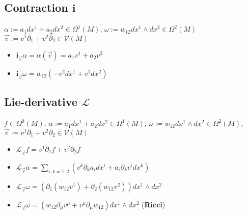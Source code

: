 \documentclass{scrartcl}
\renewcommand{\i}{\mathbf{i}}
\renewcommand{\L}{\mathbf{\mathcal{L}}}
\begin{document}
    \subsection{Contraction \( \i \)}
      \( \alpha:= a_{1}dx^{1} + a_{2}dx^{2} \in \Omega^{1}(M) \),
      \( \omega:= w_{12}dx^{1}\wedge dx^{2} \in \Omega^{2}(M)\)
      \( \vec{v} := v^{1}\partial_{1} + v^{2}\partial_{2}\in\mathcal{V}(M) \)
      \begin{itemize}
        \item \( \i_{\vec{v}}\alpha = \alpha\left( \vec{v} \right) = a_{1}v^{1} + a_{2}v^{2} \)
        \item \( \i_{\vec{v}}\omega = w_{12}\left( -v^{2}dx^{1} + v^{1}dx^{2} \right) \)
      \end{itemize}

    \subsection{Lie-derivative \( \L \)}
       \( f\in \Omega^{0}(M)\),
       \( \alpha:= a_{1}dx^{1} + a_{2}dx^{2} \in \Omega^{1}(M) \),
       \( \omega:= w_{12}dx^{1}\wedge dx^{2} \in \Omega^{2}(M) \),
       \( \vec{v} := v^{1}\partial_{1} + v^{2}\partial_{2}\in\mathcal{V}(M) \)
       \begin{itemize}
        \item \( \L_{\vec{v}}f = v^{1}\partial_{1}f + v^{2}\partial_{2}f \)
        \item \( \L_{\vec{v}}\alpha = \sum_{i,k=1,2} \left(v^{k}\partial_{k}a_{i}dx^{i} + a_{i}\partial_{k}v^{i}dx^{k}\right) \)
        \item \( \L_{\vec{v}}\omega = \left( \partial_{1}\left( w_{12}v^{1} \right) 
                                        +  \partial_{2}\left( w_{12}v^{2} \right)\right) dx^{1}\wedge dx^{2}\)
        \item \( \L_{\vec{v}}\omega = \left(w_{12}\partial_{\mu}v^{\mu} + v^{\mu}\partial_{\mu}w_{12}\right) dx^{1}\wedge dx^{2} \)
           (\textbf{Ricci})
       \end{itemize}
\end{document}
